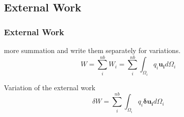 \documentclass[9pt]{beamer}
\begin{document}
\subsection{External Work}
\begin{frame}
\frametitle{External Work}
more summation and write them separately for variations. 
\begin{equation*}
 W=\sum_i^{nb} W_i=\sum_i^{nb} \int_{\Omega_i} q_i \mathbf{ u_i}  d \Omega_i
\end{equation*}

\begin{block}{Variation of the external work}
\begin{equation*}
\delta W=\sum_i^{nb} \int_{\Omega_i} q_i \mathbf{\delta u_i}  d \Omega_i
\end{equation*}
\end{block}



\end{frame}
\end{document}
